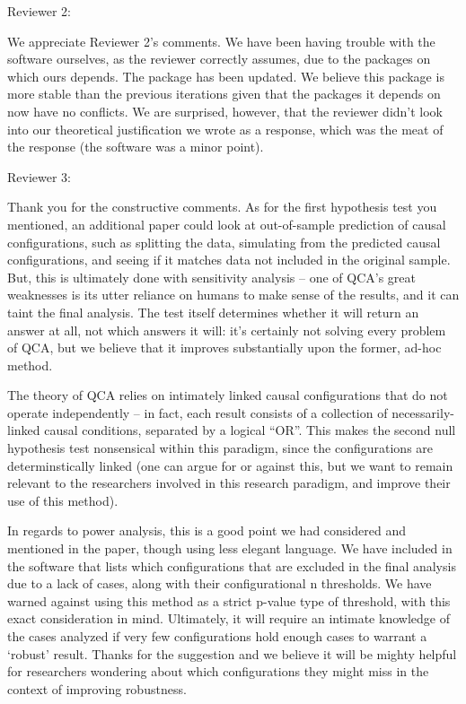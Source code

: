 \documentclass[12pt,stdletter,dateno,sigleft]{newlfm} %
\begin{document}
\begin{newlfm}
Reviewer 2: 

We appreciate Reviewer 2's comments. We have been having trouble with the software ourselves, as the reviewer correctly assumes, due to the packages on which ours depends. The package has been updated. We believe this package is more stable than the previous iterations given that the packages it depends on now have no conflicts. We are surprised, however, that the reviewer didn't look into our theoretical justification we wrote as a response, which was the meat of the response (the software was a minor point). \newline


Reviewer 3: 

Thank you for the constructive comments. As for the first hypothesis test you mentioned, an additional paper could look at out-of-sample prediction of causal configurations, such as splitting the data, simulating from the predicted causal configurations, and seeing if it matches data not included in the original sample. But, this is ultimately done with sensitivity analysis -- one of QCA's great weaknesses is its utter reliance on humans to make sense of the results, and it can taint the final analysis. The test itself determines whether it will return an answer at all, not which answers it will: it's certainly not solving every problem of QCA, but we believe that it improves substantially upon the former, ad-hoc method. 

The theory of QCA relies on intimately linked causal configurations that do not operate independently -- in fact, each result consists of a collection of necessarily-linked causal conditions, separated by a logical ``OR''. This makes the second null hypothesis test nonsensical within this paradigm, since the configurations are determinstically linked (one can argue for or against this, but we want to remain relevant to the researchers involved in this research paradigm, and improve their use of this method). 

In regards to power analysis, this is a good point we had considered and mentioned in the paper, though using less elegant language. We have included in the software that lists which configurations that are excluded in the final analysis due to a lack of cases, along with their configurational n thresholds. We have warned against using this method as a strict p-value type of threshold, with this exact consideration in mind. Ultimately, it will require an intimate knowledge of the cases analyzed if very few configurations hold enough cases to warrant a `robust' result. Thanks for the suggestion and we believe it will be mighty helpful for researchers wondering about which configurations they might miss in the context of improving robustness.  \newline




\end{newlfm}
\end{document}
